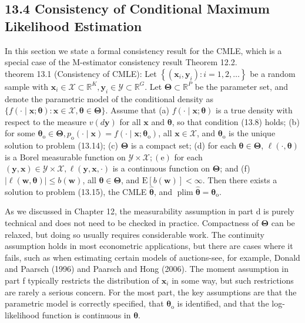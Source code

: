 \documentclass[10pt]{article}
\begin{document}
\subsection*{13.4 Consistency of Conditional Maximum Likelihood Estimation}
In this section we state a formal consistency result for the CMLE, which is a special case of the M-estimator consistency result Theorem 12.2.\\
theorem 13.1 (Consistency of CMLE): Let $\left\{\left(\mathbf{x}_{i}, \mathbf{y}_{i}\right): i=1,2, \ldots\right\}$ be a random sample with $\mathbf{x}_{i} \in \mathscr{X} \subset \mathbb{R}^{K}, \mathbf{y}_{i} \in \mathscr{Y} \subset \mathbb{R}^{G}$. Let $\boldsymbol{\Theta} \subset \mathbb{R}^{P}$ be the parameter set, and denote the parametric model of the conditional density as $\{f(\cdot \mid \mathbf{x} ; \boldsymbol{\theta}): \mathbf{x} \in \mathscr{X}, \boldsymbol{\theta} \in \boldsymbol{\Theta}\}$. Assume that (a) $f(\cdot \mid \mathbf{x} ; \boldsymbol{\theta})$ is a true density with respect to the measure $v(d \mathbf{y})$ for all $\mathbf{x}$ and $\boldsymbol{\theta}$, so that condition (13.8) holds; (b) for some $\boldsymbol{\theta}_{\mathrm{o}} \in \boldsymbol{\Theta}, p_{\mathrm{o}}(\cdot \mid \mathbf{x})=f\left(\cdot \mid \mathbf{x} ; \boldsymbol{\theta}_{\mathrm{o}}\right)$, all $\mathbf{x} \in \mathscr{X}$, and $\boldsymbol{\theta}_{\mathrm{o}}$ is the unique solution to problem (13.14); (c) $\boldsymbol{\Theta}$ is a compact set; (d) for each $\boldsymbol{\theta} \in \boldsymbol{\Theta}$, $\ell(\cdot, \boldsymbol{\theta})$ is a Borel measurable function on $\mathscr{Y} \times \mathscr{X} ;(\mathrm{e})$ for each $(\mathbf{y}, \mathbf{x}) \in \mathscr{Y} \times \mathscr{X}, \ell(\mathbf{y}, \mathbf{x}, \cdot)$ is a continuous function on $\boldsymbol{\Theta}$; and (f) $|\ell(\mathbf{w}, \boldsymbol{\theta})| \leq b(\mathbf{w})$, all $\boldsymbol{\theta} \in \boldsymbol{\Theta}$, and $\mathrm{E}[b(\mathbf{w})]<\infty$. Then there exists a solution to problem (13.15), the CMLE $\hat{\boldsymbol{\theta}}$, and $\operatorname{plim} \hat{\boldsymbol{\theta}}=\boldsymbol{\theta}_{\mathrm{o}}$.

As we discussed in Chapter 12, the measurability assumption in part d is purely technical and does not need to be checked in practice. Compactness of $\boldsymbol{\Theta}$ can be relaxed, but doing so usually requires considerable work. The continuity assumption holds in most econometric applications, but there are cases where it fails, such as when estimating certain models of auctions-see, for example, Donald and Paarsch (1996) and Paarsch and Hong (2006). The moment assumption in part f typically restricts the distribution of $\mathbf{x}_{i}$ in some way, but such restrictions are rarely a serious concern. For the most part, the key assumptions are that the parametric model is correctly specified, that $\boldsymbol{\theta}_{\mathrm{o}}$ is identified, and that the log-likelihood function is continuous in $\boldsymbol{\theta}$.
\end{document}
